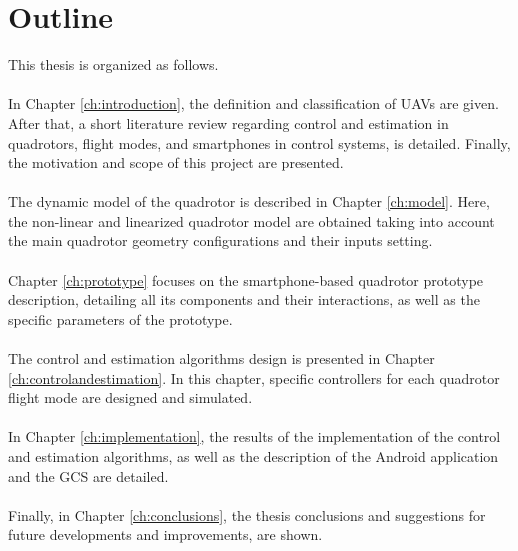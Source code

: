 \section{Outline}
This thesis is organized as follows.\\\\
In Chapter \ref{ch:introduction}, the definition and classification of UAVs are given. After that, a short literature review regarding control and estimation in quadrotors, flight modes, and smartphones in control systems, is detailed. Finally, the motivation and scope of this project are presented.
\\\\
The dynamic model of the quadrotor is described in Chapter \ref{ch:model}. Here, the non-linear and linearized quadrotor model are obtained taking into account the main quadrotor geometry configurations and their inputs setting. 
\\\\
Chapter \ref{ch:prototype} focuses on the smartphone-based quadrotor prototype description, detailing all its components and their interactions, as well as the specific parameters of the prototype.
\\\\
The control and estimation algorithms design is presented in Chapter \ref{ch:controlandestimation}. In this chapter, specific controllers for each quadrotor flight mode are designed and simulated.
\\\\
In Chapter \ref{ch:implementation}, the results of the implementation of the control and estimation algorithms, as well as the description of the Android application and the GCS are detailed.
\\\\
Finally, in Chapter \ref{ch:conclusions}, the thesis conclusions and suggestions for future developments and improvements, are shown.